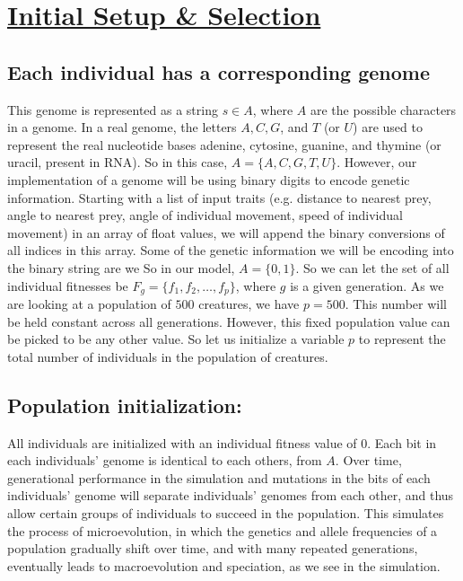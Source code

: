 \newpage
\section{\underline{Initial Setup \& Selection}}

\bigbreak
\nid \subsection{Each individual has a corresponding genome}

\bigbreak
This genome is represented as a string $s\in A$, where $A$ are the possible characters in a genome. In a real genome, the letters $A, C, G$, and $T$ (or $U$) are used to represent the real nucleotide bases adenine, cytosine, guanine, and thymine (or uracil, present in RNA). So in this case, $A=\{A, C, G, T, U\}$. However, our implementation of a genome will be using binary digits to encode genetic information. Starting with a list of input traits (e.g. distance to nearest prey, angle to nearest prey, angle of individual movement, speed of individual movement) in an array of float values, we will append the binary conversions of all indices in this array. Some of the genetic information we will be encoding into the binary string are we  So in our model, $A=\{0,1\}$. So we can let the set of all individual fitnesses be $F_g=\{f_1, f_2, \ldots, f_p\}$, where $g$ is a given generation. As we are looking at a population of $500$ creatures, we have $p=500$. This number will be held constant across all generations. However, this fixed population value can be picked to be any other value. So let us initialize a variable $p$ to represent the total number of individuals in the population of creatures. 

\bigbreak
\nid \subsection{Population initialization:}

\bigbreak
All individuals are initialized with an individual fitness value of $0$. Each bit in each individuals' genome is identical to each others, from $A$. Over time, generational performance in the simulation and mutations in the bits of each individuals' genome will separate individuals' genomes from each other, and thus allow certain groups of individuals to succeed in the population. This simulates the process of microevolution, in which the genetics and allele frequencies of a population gradually shift over time, and with many repeated generations, eventually leads to macroevolution and speciation, as we see in the simulation. \\

